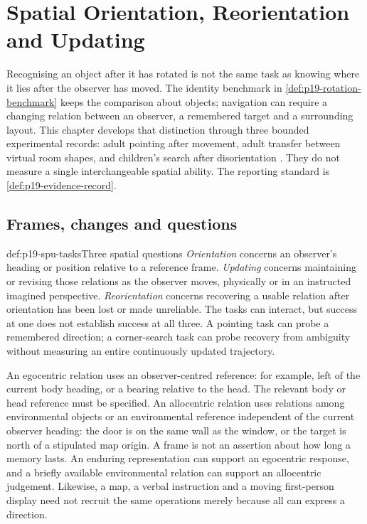 \chapter{Spatial Orientation, Reorientation and Updating}
\label{sec:p19-spatial-orientation-and-updating}

Recognising an object after it has rotated is not the same task as
knowing where it lies after the observer has moved.
The identity benchmark in \cref{def:p19-rotation-benchmark} keeps
the comparison about objects; navigation can require a changing
relation between an observer, a remembered target and a surrounding
layout. This chapter develops that distinction through three bounded
experimental records: adult pointing after movement, adult transfer
between virtual room shapes, and children's search after disorientation
\cite{LiuXiao2018UpdatingSPU,AmbostaEtAl2013ReorientationSPU,
ShustermanEtAl2011NavigationDASHSPU}.
They do not measure a single interchangeable spatial ability.
The reporting standard is \cref{def:p19-evidence-record}.

\section{Frames, changes and questions}
\label{sec:p19-spu-frames}

\begin{hbdefinition}{def:p19-spu-tasks}{Three spatial questions}
\emph{Orientation} concerns an observer's heading or position relative
to a reference frame. \emph{Updating} concerns maintaining or revising
those relations as the observer moves, physically or in an instructed
imagined perspective. \emph{Reorientation} concerns recovering a usable
relation after orientation has been lost or made unreliable.
The tasks can interact, but success at one does not establish success
at all three. A pointing task can probe a remembered direction;
a corner-search task can probe recovery from ambiguity without
measuring an entire continuously updated trajectory.
\end{hbdefinition}

An egocentric relation uses an observer-centred reference: for example,
left of the current body heading, or a bearing relative to the head.
The relevant body or head reference must be specified.
An allocentric relation uses relations among environmental objects
or an environmental reference independent of the current observer
heading: the door is on the same wall as the window, or the target is
north of a stipulated map origin. A frame is not an assertion about
how long a memory lasts. An enduring representation can support an
egocentric response, and a briefly available environmental relation
can support an allocentric judgement. Likewise, a map, a verbal
instruction and a moving first-person display need not recruit the
same operations merely because all can express a direction.

